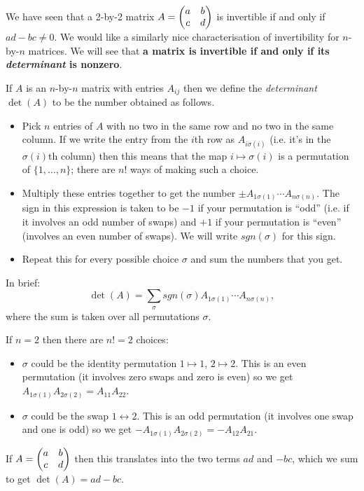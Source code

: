 \documentclass{article}
\begin{document}
We have seen that a 2-by-2 matrix \(A=\begin{pmatrix} a & b \\ c & d \end{pmatrix}\) is
invertible if and only if \(ad-bc\neq 0\). We would like a similarly
nice characterisation of invertibility for \(n\)-by-\(n\) matrices.
We will see that {\bf a matrix is invertible if and only if its {\em
determinant} is nonzero}.


\begin{Definition}[Determinant]\label{dfn:det}
If \(A\) is an \(n\)-by-\(n\) matrix with entries \(A_{ij}\) then we
define the {\em determinant} \(\det(A)\) to be the number obtained
as follows.
\begin{itemize}
\item Pick \(n\) entries of \(A\) with no two in the same row and no two
in the same column. If we write the entry from the \(i\)th row as
\(A_{i\sigma(i)}\) (i.e. it's in the \(\sigma(i)\)th column) then
this means that the map \(i\mapsto\sigma(i)\) is a permutation of
\(\{1,\ldots,n\}\); there are \(n!\) ways of making such a choice.
\item Multiply these entries together to get the number \(\pm
A_{1\sigma(1)}\cdots A_{n\sigma(n)}\). The sign in this expression
is taken to be \(-1\) if your permutation is ``odd'' (i.e. if it
involves an odd number of swaps) and \(+1\) if your permutation is
``even'' (involves an even number of swaps). We will write
\(sgn(\sigma)\) for this sign.
\item Repeat this for every possible choice \(\sigma\) and sum the
numbers that you get.
\end{itemize}
In brief: \[\det(A)=\sum_{\sigma}sgn(\sigma)A_{1\sigma(1)}\cdots
A_{n\sigma(n)},\] where the sum is taken over all permutations
\(\sigma\).


\end{Definition}
\begin{Example}\label{exm:det2}
If \(n=2\) then there are \(n!=2\) choices:
\begin{itemize}
\item \(\sigma\) could be the identity permutation \(1\mapsto 1\),
\(2\mapsto 2\). This is an even permutation (it involves zero
swaps and zero is even) so we get
\(A_{1\sigma(1)}A_{2\sigma(2)}=A_{11}A_{22}\).
\item \(\sigma\) could be the swap \(1\leftrightarrow 2\). This is an
odd permutation (it involves one swap and one is odd) so we get
\(-A_{1\sigma(1)}A_{2\sigma(2)}=-A_{12}A_{21}\).
\end{itemize}
If \(A=\begin{pmatrix} a & b \\ c & d\end{pmatrix}\) then this translates into the two
terms \(ad\) and \(-bc\), which we sum to get \(\det(A)=ad-bc\).


\end{Example}
\end{document}
